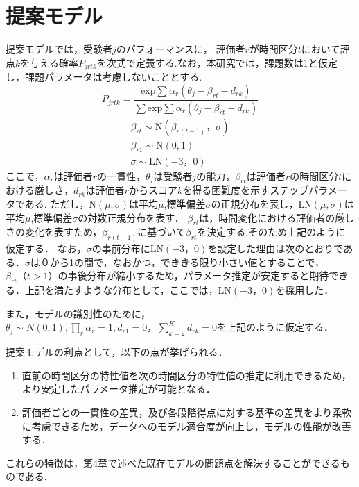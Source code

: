 \documentclass[a4paper,11pt,oneside,openany]{jsbook}
\begin{document}
\chapter{提案モデル}
提案モデルでは，受験者$j$のパフォーマンスに， 評価者$r$が時間区分$t$において評点$k$を与える確率$P_{jrtk}$を次式で定義する.なお，本研究では，課題数は1と仮定し，課題パラメータは考慮しないこととする.
\begin{displaymath}
P_{jrtk}=\frac{\mathrm{exp}\sum{\alpha_r(\theta_{j}-\beta_{rt}-d_{rk})}}{\sum \mathrm{exp}\sum{\alpha_r(\theta_{j}-\beta_{rt}-d_{rk})}}
\end{displaymath}
\begin{eqnarray}
  \beta_{rt}\sim \mathrm{N}(\beta_{r(t-1)}，\sigma)\nonumber\\
  \beta_{r1} \sim \mathrm{N}(0,1)\nonumber\\
  \sigma \sim \mathrm{LN}(-3，0)\nonumber
\end{eqnarray}
ここで，$\alpha_{r}$は評価者$r$の一貫性，$\theta_{j}$は受験者$j$の能力，$\beta_{rt}は$評価者$r$の時間区分$t$における厳しさ，$d_{rk}$は評価者$r$からスコア$k$を得る困難度を示すステップパラメータである.
ただし，$\mathrm{N}(\mu,\sigma)$は平均$\mu$,標準偏差$\sigma$の正規分布を表し，$\mathrm{LN}(\mu,\sigma)$は平均$\mu$,標準偏差$\sigma$の対数正規分布を表す．
$\beta_{rt}$は，時間変化における評価者の厳しさの変化を表すため，$\beta_{r(t-1)}$に基づいて$\beta_{rt}$を決定する.そのため上記のように仮定する．
なお，$\sigma$の事前分布に$\mathrm{LN}(-3，0)$を設定した理由は次のとおりである．$\sigma$は０から1の間で，なおかつ，でききる限り小さい値とすることで，$\beta_{rt}（t>1）$の事後分布が縮小するため，パラメータ推定が安定すると期待できる．上記を満たすような分布として，ここでは，$\mathrm{LN}(-3，0)$を採用した．

また，モデルの識別性のために，$\theta_{j}\sim N(0,1),\prod_{r}\alpha_r=1,d_{r1}=0，\sum_{k=2}^{K}d_{rk}=0$を上記のように仮定する．

提案モデルの利点として，以下の点が挙げられる．
\begin{enumerate}
  \item 直前の時間区分の特性値を次の時間区分の特性値の推定に利用できるため，より安定したパラメータ推定が可能となる．
  \item 評価者ごとの一貫性の差異，及び各段階得点に対する基準の差異をより柔軟に考慮できるため，データへのモデル適合度が向上し，モデルの性能が改善する．
\end{enumerate}
これらの特徴は，第4章で述べた既存モデルの問題点を解決することができるものである.
\end{document}
